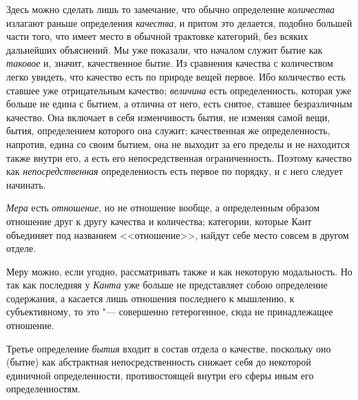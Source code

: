 Здесь можно сделать лишь то замечание, что обычно определение
{\em количества} излагают раньше определения
{\em качества}, и притом это делается, подобно большей
части того, что имеет место в обычной трактовке категорий, без всяких
дальнейших объяснений. Мы уже показали, что началом служит бытие как
{\em таковое} и, значит, качественное бытие. Из
сравнения качества с количеством легко увидеть, что качество есть по
природе вещей первое. Ибо количество есть ставшее уже отрицательным
качество; {\em величина} есть определенность, которая
уже больше не едина с бытием, а отлична от него, есть снятое, ставшее
безразличным качество. Она включает в себя изменчивость бытия, не изменяя
самой вещи, бытия, определением которого она служит; качественная же
определенность, напротив, едина со своим бытием, она не выходит за его
пределы и не находится также внутри его, а есть его непосредственная
ограниченность. Поэтому качество как
{\em непосредственная} определенность есть первое по
порядку, и с него следует начинать.

{\em Мера} есть {\em отношение}, но
не отношение вообще, а определенным образом отношение друг к другу качества
и количества; категории, которые Кант объединяет под названием <<отношение>>,
найдут себе место совсем в другом отделе.

Меру можно, если угодно, рассматривать также и как некоторую модальность. Но
так как последняя у {\em Канта} уже больше не
представляет собою определение содержания, а касается лишь отношения
последнего к мышлению, к субъективному, то это "--- совершенно гетерогенное,
сюда не принадлежащее отношение.

Третье определение {\em бытия} входит в состав отдела о
качестве, поскольку оно (бытие) как абстрактная непосредственность снижает
себя до некоторой единичной определенности, противостоящей внутри его сферы
иным его определенностям.

\bigskip
